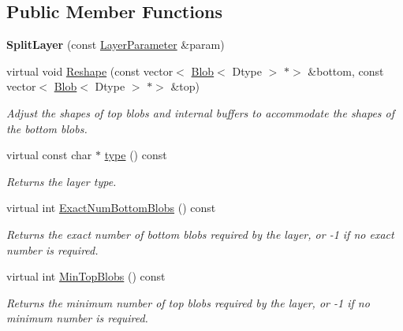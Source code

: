 \subsection*{Public Member Functions}
\begin{DoxyCompactItemize}
\item 
\mbox{\label{classcaffe_1_1_split_layer_a784222a81f1921b68bf814fc9dc5d1aa}} 
{\bfseries Split\+Layer} (const \mbox{\hyperlink{classcaffe_1_1_layer_parameter}{Layer\+Parameter}} \&param)
\item 
virtual void \mbox{\hyperlink{classcaffe_1_1_split_layer_a4e978965461dedcc2fbb905e4910c0b1}{Reshape}} (const vector$<$ \mbox{\hyperlink{classcaffe_1_1_blob}{Blob}}$<$ Dtype $>$ $\ast$$>$ \&bottom, const vector$<$ \mbox{\hyperlink{classcaffe_1_1_blob}{Blob}}$<$ Dtype $>$ $\ast$$>$ \&top)
\begin{DoxyCompactList}\small\item\em Adjust the shapes of top blobs and internal buffers to accommodate the shapes of the bottom blobs. \end{DoxyCompactList}\item 
\mbox{\label{classcaffe_1_1_split_layer_a69113b39e1f3f1ad83b5765496fcdb35}} 
virtual const char $\ast$ \mbox{\hyperlink{classcaffe_1_1_split_layer_a69113b39e1f3f1ad83b5765496fcdb35}{type}} () const
\begin{DoxyCompactList}\small\item\em Returns the layer type. \end{DoxyCompactList}\item 
virtual int \mbox{\hyperlink{classcaffe_1_1_split_layer_a8ff310ac37e1e79ce6ef8fbc95be0cd9}{Exact\+Num\+Bottom\+Blobs}} () const
\begin{DoxyCompactList}\small\item\em Returns the exact number of bottom blobs required by the layer, or -\/1 if no exact number is required. \end{DoxyCompactList}\item 
virtual int \mbox{\hyperlink{classcaffe_1_1_split_layer_a48dafac272f2f098798e3caa09afbabe}{Min\+Top\+Blobs}} () const
\begin{DoxyCompactList}\small\item\em Returns the minimum number of top blobs required by the layer, or -\/1 if no minimum number is required. \end{DoxyCompactList}\item 

\end{DoxyCompactItemize}
